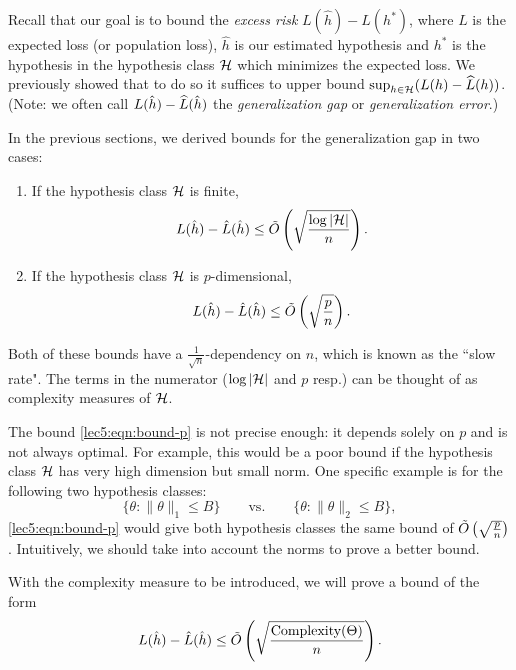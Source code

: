 



Recall that our goal is to bound the \textit{excess risk} $L(\hat{h}) - L(h^*)$, where $L$ is the expected loss (or population loss), $\hat{h}$ is our estimated hypothesis and $h^*$ is the hypothesis in the hypothesis class $\mathcal H$ which minimizes the expected loss. We previously showed that to do so it suffices to upper bound $\sup_{h\in \mathcal H} (L (h) - \widehat{L}(h))$. (Note: we often call $L(\hat{h}) - \widehat{L}(\hat{h})$ the \textit{generalization gap} or \textit{generalization error}.)

In the previous sections, we derived bounds for the generalization gap in two cases:
\begin{enumerate}
	\item If the hypothesis class $\mathcal H$ is finite,
	\begin{equation}\label{lec5:eqn:bound-finite}
	L(\hat h) - \hat L(\hat h) \leq \tilde O \left( \sqrt{\frac{\log |\mathcal H|}{n}} \right).
	\end{equation}
	\item If the hypothesis class $\mathcal H$ is $p$-dimensional,
	\begin{equation}\label{lec5:eqn:bound-p}
	L(\hat h) - \hat L(\hat h) \leq \tilde O \left( \sqrt{\frac{p}{n}} \right).
	\end{equation}
\end{enumerate} 
Both of these bounds have a $\frac{1}{\sqrt{n}}$-dependency on $n$, which is known as the ``slow rate". The terms in the numerator ($\log |\mathcal H|$ and $p$ resp.) can be thought of as complexity measures of $\mathcal H$.

The bound \eqref{lec5:eqn:bound-p} is not precise enough: it depends solely on $p$ and is not always optimal. For example, this would be a poor bound if the hypothesis class $\mathcal H$ has very high dimension but small norm. One specific example is for the following two hypothesis classes:
$$ \{\theta : \|\theta\|_1 \leq B\} \qquad \text{vs.} \qquad \{\theta : \|\theta\|_2 \leq B\},$$
\eqref{lec5:eqn:bound-p} would give both hypothesis classes the same bound of $\tilde O \left( \sqrt{\frac{p}{n}} \right)$. Intuitively, we should take into account the norms to prove a better bound.

With the complexity measure to be introduced, we will prove a bound of the form
\begin{align}
    L(\hat h) - \hat L(\hat h) \leq \tilde O\left(\sqrt{\frac{\text{Complexity}(\Theta)}{n}}\right).
\end{align}


